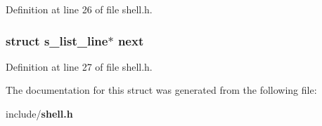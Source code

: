 Definition at line 26 of file shell.\-h.

\subsubsection[{next}]{\setlength{\rightskip}{0pt plus 5cm}struct {\bf s\-\_\-list\-\_\-line}$\ast$ next}\label{structs__list__line_a3263d832fe4969fc3f9dbd0e668e0935}


Definition at line 27 of file shell.\-h.



The documentation for this struct was generated from the following file\-:\begin{DoxyCompactItemize}
\item 
include/{\bf shell.\-h}\end{DoxyCompactItemize}
